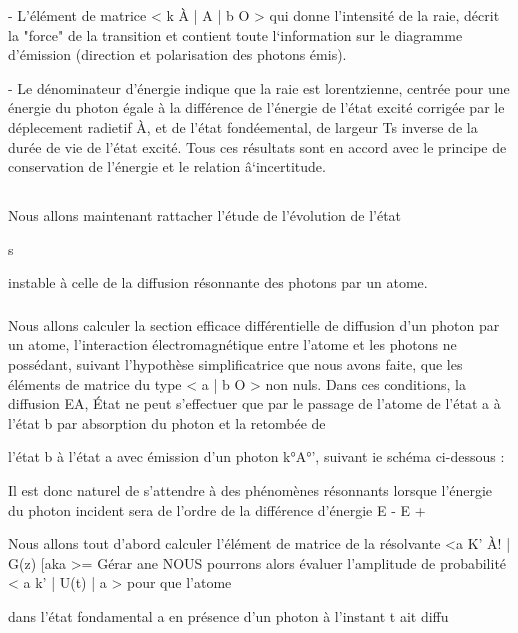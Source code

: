 - L'élément de matrice <  k À | A | b O > qui donne l'intensité de la raie, décrit la "force" de la transition et contient toute l‘information sur le diagramme d'émission (direction et polarisation des photons
émis).

- Le dénominateur d'énergie indique que la raie est lorentzienne,
centrée pour une énergie du photon égale à la différence de l'énergie de l'état
excité corrigée par le déplecement radietif À, et de l'état fondéemental, de
largeur Ts inverse de la durée de vie de l'état excité. Tous ces résultats sont
en accord avec le principe de conservation de l'énergie et le relation â‘incertitude.

\subsection{}%



Nous allons maintenant rattacher l'étude de l'évolution de l'état

s

instable à celle de la diffusion résonnante des photons par un atome.
\subsubsection{}%

Nous allons calculer la section efficace différentielle de diffusion d'un photon par un atome, l'interaction électromagnétique entre l'atome
et les photons ne possédant, suivant l'hypothèse simplificatrice que nous avons
faite, que les éléments de matrice du type < a | b O > non nuls. Dans
ces conditions, la diffusion EA, État ne peut s'effectuer que par le passage de
l'atome de l'état a à l'état b par absorption du photon  et la retombée de

l'état b à l'état a avec émission d'un photon k°A°', suivant ie schéma ci-dessous :


Il est donc naturel de s'attendre à des phénomènes résonnants
lorsque l'énergie du photon incident sera de l'ordre de la différence d'énergie E  - E +

Nous allons tout d'abord calculer l'élément de matrice de la
résolvante <a K' À! | G(z) [aka >= Gérar ane NOUS pourrons alors évaluer l'amplitude de probabilité < a k'  | U(t) | a > pour que l'atome

dans l'état fondamental a en présence d'un photon  à l'instant t ait diffu

